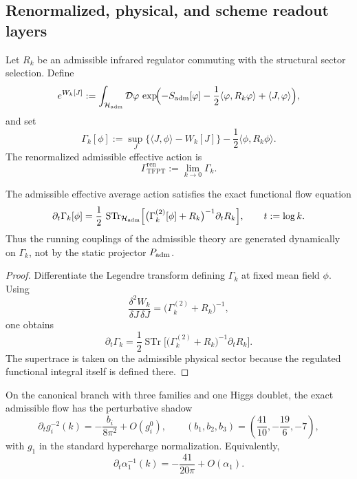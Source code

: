 \subsection{Renormalized, physical, and scheme readout layers}

\begin{definition}
\label{def:admissible-effective-average-action}
Let $R_k$ be an admissible infrared regulator commuting with the structural sector selection.
Define
\[
e^{W_k[J]}
:=
\int_{\mathcal H_{\mathrm{adm}}}\mathcal D\varphi\,
\exp\!\Bigl(
-S_{\mathrm{adm}}[\varphi]
-\frac12\langle \varphi,R_k\varphi\rangle
+\langle J,\varphi\rangle
\Bigr),
\]
and set
\[
\Gamma_k[\phi]
:=
\sup_J\{\langle J,\phi\rangle-W_k[J]\}
-\frac12\langle \phi,R_k\phi\rangle.
\]
The renormalized admissible effective action is
\[
\Gamma_{\mathrm{TFPT}}^{\mathrm{ren}}:=\lim_{k\to0}\Gamma_k.
\]
\end{definition}

\begin{theorem}
\label{thm:exact-admissible-rg-flow}
The admissible effective average action satisfies the exact functional flow equation
\[
\partial_t \Gamma_k[\phi]
=
\frac12\,
\operatorname{STr}_{\mathcal H_{\mathrm{adm}}}
\Bigl[
\bigl(\Gamma_k^{(2)}[\phi]+R_k\bigr)^{-1}
\partial_t R_k
\Bigr],
\qquad
t:=\log k.
\]
Thus the running couplings of the admissible theory are generated dynamically on $\Gamma_k$, not by
the static projector $P_{\mathrm{adm}}$.
\end{theorem}

\begin{proof}
Differentiate the Legendre transform defining $\Gamma_k$ at fixed mean field $\phi$. Using
\[
\frac{\delta^2 W_k}{\delta J\,\delta J}
=
\bigl(\Gamma_k^{(2)}+R_k\bigr)^{-1},
\]
one obtains
\[
\partial_t \Gamma_k
=
\frac12 \operatorname{STr}
\bigl[
\bigl(\Gamma_k^{(2)}+R_k\bigr)^{-1}\partial_t R_k
\bigr].
\]
The supertrace is taken on the admissible physical sector because the regulated functional integral
itself is defined there.
\end{proof}

\begin{corollary}
\label{cor:one-loop-shadow-exact-flow}
On the canonical branch with three families and one Higgs doublet, the exact admissible flow has
the perturbative shadow
\[
\partial_t g_i^{-2}(k)=-\frac{b_i}{8\pi^2}+O(g_i^0),
\qquad
(b_1,b_2,b_3)=\left(\frac{41}{10},-\frac{19}{6},-7\right),
\]
with $g_1$ in the standard hypercharge normalization. Equivalently,
\[
\partial_t \alpha_1^{-1}(k)=-\frac{41}{20\pi}+O(\alpha_1).
\]
\end{corollary}

